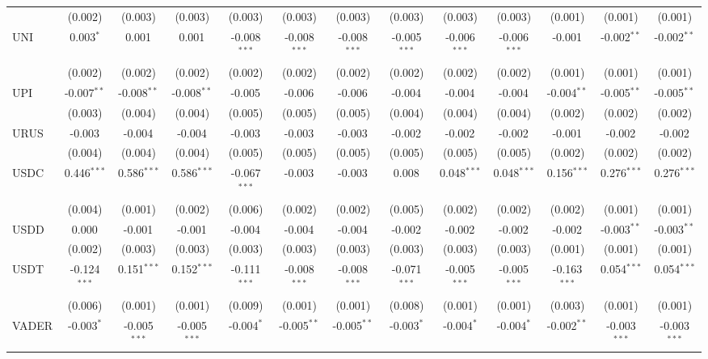 \begin{table}[!htbp]
\begin{tabular}{@{\extracolsep{5pt}}lcccccccccccc}
  & (0.002) & (0.003) & (0.003) & (0.003) & (0.003) & (0.003) & (0.003) & (0.003) & (0.003) & (0.001) & (0.001) & (0.001) \\
 UNI & 0.003$^{*}$ & 0.001$^{}$ & 0.001$^{}$ & -0.008$^{***}$ & -0.008$^{***}$ & -0.008$^{***}$ & -0.005$^{***}$ & -0.006$^{***}$ & -0.006$^{***}$ & -0.001$^{}$ & -0.002$^{**}$ & -0.002$^{**}$ \\
  & (0.002) & (0.002) & (0.002) & (0.002) & (0.002) & (0.002) & (0.002) & (0.002) & (0.002) & (0.001) & (0.001) & (0.001) \\
 UPI & -0.007$^{**}$ & -0.008$^{**}$ & -0.008$^{**}$ & -0.005$^{}$ & -0.006$^{}$ & -0.006$^{}$ & -0.004$^{}$ & -0.004$^{}$ & -0.004$^{}$ & -0.004$^{**}$ & -0.005$^{**}$ & -0.005$^{**}$ \\
  & (0.003) & (0.004) & (0.004) & (0.005) & (0.005) & (0.005) & (0.004) & (0.004) & (0.004) & (0.002) & (0.002) & (0.002) \\
 URUS & -0.003$^{}$ & -0.004$^{}$ & -0.004$^{}$ & -0.003$^{}$ & -0.003$^{}$ & -0.003$^{}$ & -0.002$^{}$ & -0.002$^{}$ & -0.002$^{}$ & -0.001$^{}$ & -0.002$^{}$ & -0.002$^{}$ \\
  & (0.004) & (0.004) & (0.004) & (0.005) & (0.005) & (0.005) & (0.005) & (0.005) & (0.005) & (0.002) & (0.002) & (0.002) \\
 USDC & 0.446$^{***}$ & 0.586$^{***}$ & 0.586$^{***}$ & -0.067$^{***}$ & -0.003$^{}$ & -0.003$^{}$ & 0.008$^{}$ & 0.048$^{***}$ & 0.048$^{***}$ & 0.156$^{***}$ & 0.276$^{***}$ & 0.276$^{***}$ \\
  & (0.004) & (0.001) & (0.002) & (0.006) & (0.002) & (0.002) & (0.005) & (0.002) & (0.002) & (0.002) & (0.001) & (0.001) \\
 USDD & 0.000$^{}$ & -0.001$^{}$ & -0.001$^{}$ & -0.004$^{}$ & -0.004$^{}$ & -0.004$^{}$ & -0.002$^{}$ & -0.002$^{}$ & -0.002$^{}$ & -0.002$^{}$ & -0.003$^{**}$ & -0.003$^{**}$ \\
  & (0.002) & (0.003) & (0.003) & (0.003) & (0.003) & (0.003) & (0.003) & (0.003) & (0.003) & (0.001) & (0.001) & (0.001) \\
 USDT & -0.124$^{***}$ & 0.151$^{***}$ & 0.152$^{***}$ & -0.111$^{***}$ & -0.008$^{***}$ & -0.008$^{***}$ & -0.071$^{***}$ & -0.005$^{***}$ & -0.005$^{***}$ & -0.163$^{***}$ & 0.054$^{***}$ & 0.054$^{***}$ \\
  & (0.006) & (0.001) & (0.001) & (0.009) & (0.001) & (0.001) & (0.008) & (0.001) & (0.001) & (0.003) & (0.001) & (0.001) \\
 VADER & -0.003$^{*}$ & -0.005$^{***}$ & -0.005$^{***}$ & -0.004$^{*}$ & -0.005$^{**}$ & -0.005$^{**}$ & -0.003$^{*}$ & -0.004$^{*}$ & -0.004$^{*}$ & -0.002$^{**}$ & -0.003$^{***}$ & -0.003$^{***}$ \\

\end{tabular}
\end{table}
